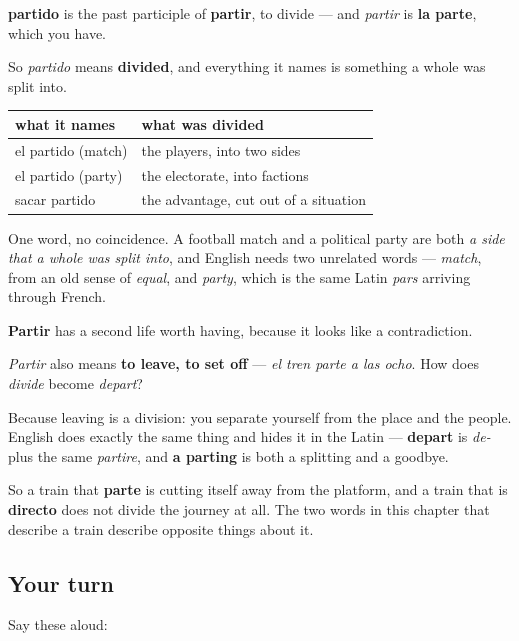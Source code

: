 \begin{cousinweb}
\textbf{partido} is the past participle of \textbf{partir}, to divide — and \emph{partir} is \textbf{la parte}, which you have.

So \emph{partido} means \textbf{divided}, and everything it names is something a whole was split into.

\noindent
\begin{tabularx}{\linewidth}{@{}>{\raggedright\arraybackslash}X>{\raggedright\arraybackslash}X@{}}
\toprule
\textbf{what it names} & \textbf{what was divided} \\
\midrule
el partido (match) & the players, into two sides \\
el partido (party) & the electorate, into factions \\
sacar partido & the advantage, cut out of a situation \\
\bottomrule
\end{tabularx}

One word, no coincidence. A football match and a political party are both \emph{a side that a whole was split into}, and English needs two unrelated words — \emph{match}, from an old sense of \emph{equal}, and \emph{party}, which is the same Latin \emph{pars} arriving through French.
\end{cousinweb}

\begin{culture}
\textbf{Partir} has a second life worth having, because it looks like a contradiction.

\emph{Partir} also means \textbf{to leave, to set off} — \emph{el tren parte a las ocho}. How does \emph{divide} become \emph{depart}?

Because leaving is a division: you separate yourself from the place and the people. English does exactly the same thing and hides it in the Latin — \textbf{depart} is \emph{de-} plus the same \emph{partire}, and \textbf{a parting} is both a splitting and a goodbye.

So a train that \textbf{parte} is cutting itself away from the platform, and a train that is \textbf{directo} does not divide the journey at all. The two words in this chapter that describe a train describe opposite things about it.
\end{culture}

\subsection*{Your turn}
Say these aloud:

